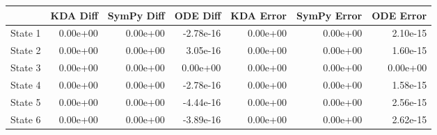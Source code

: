 \begin{tabular}{lrrrrrr}
\toprule
{} &  KDA Diff &  SymPy Diff &  ODE Diff &  KDA Error &  SymPy Error &  ODE Error \\
\midrule
State 1 &  0.00e+00 &    0.00e+00 & -2.78e-16 &   0.00e+00 &     0.00e+00 &   2.10e-15 \\
State 2 &  0.00e+00 &    0.00e+00 &  3.05e-16 &   0.00e+00 &     0.00e+00 &   1.60e-15 \\
State 3 &  0.00e+00 &    0.00e+00 &  0.00e+00 &   0.00e+00 &     0.00e+00 &   0.00e+00 \\
State 4 &  0.00e+00 &    0.00e+00 & -2.78e-16 &   0.00e+00 &     0.00e+00 &   1.58e-15 \\
State 5 &  0.00e+00 &    0.00e+00 & -4.44e-16 &   0.00e+00 &     0.00e+00 &   2.56e-15 \\
State 6 &  0.00e+00 &    0.00e+00 & -3.89e-16 &   0.00e+00 &     0.00e+00 &   2.62e-15 \\
\bottomrule
\end{tabular}
